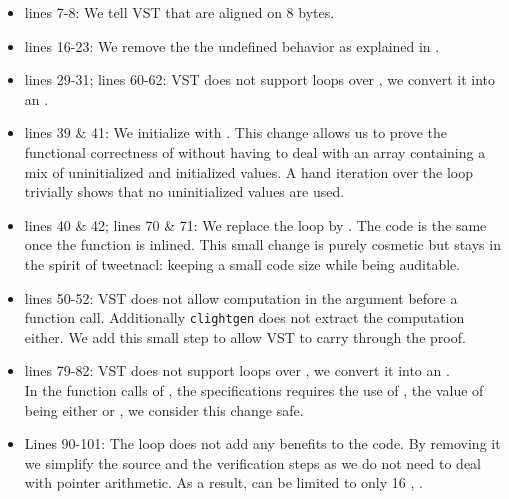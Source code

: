 \begin{itemize}
  \item lines 7-8: We tell VST that  are
  aligned on 8 bytes.

  \item lines 16-23: We remove the the undefined behavior as explained in .

  \item lines 29-31; lines 60-62: VST does not support  loops over , we convert it into an .

  \item lines 39 \& 41: We initialize  with .
  This change allows us to prove the functional correctness of  without having to deal with an array containing
  a mix of uninitialized and initialized values.
  A hand iteration over the loop trivially shows that no uninitialized values are used.

  \item lines 40 \& 42; lines 70 \& 71: We replace the  loop by . The code is the same once the function is inlined. This small change is purely cosmetic but stays in the spirit of tweetnacl: keeping a small code size while being auditable.

  \item lines 50-52: VST does not allow computation in the argument before a function call. Additionally \texttt{clightgen} does not extract the computation either. We add this small step to allow VST to carry through the proof.



  \item lines 79-82: VST does not support  loops over , we convert it into an .\\
  In the function calls of , the specifications requires the use of , the value of  being either  or , we consider this change safe.

  \item Lines 90-101: The  loop does not add any benefits to the code. By removing it we simplify the source and the verification steps as we do not need to deal with pointer arithmetic. As a result,  can be limited to only 16 , \ie {}.

\end{itemize}
